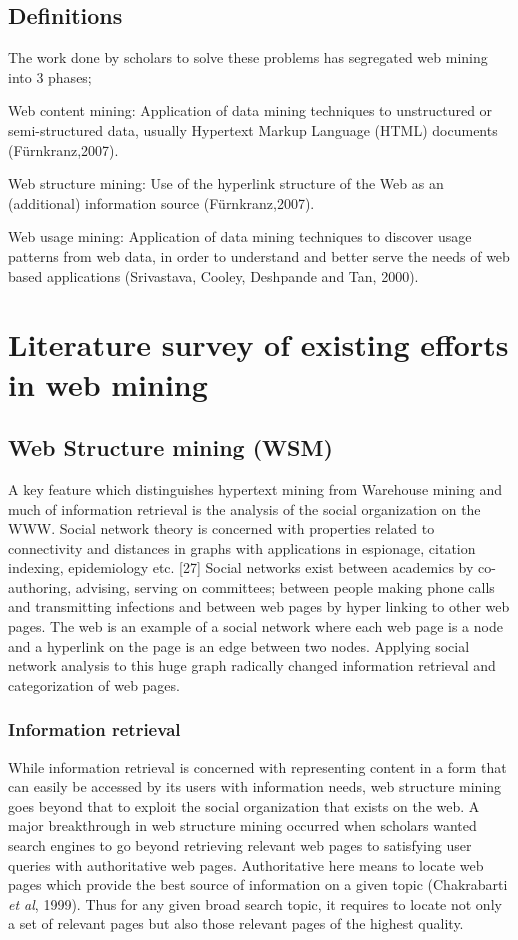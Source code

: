 \documentclass{article}
\begin{document}
\subsection{Definitions}
The work done by scholars to solve these problems has segregated web mining into 3 phases; 

 Web content mining: Application of data mining techniques to unstructured or semi-structured data, usually Hypertext Markup Language (HTML) documents (Fürnkranz,2007).

Web structure mining: Use of the hyperlink structure of the Web as an (additional) information source (Fürnkranz,2007).

Web usage mining:  Application of data mining techniques to discover usage patterns from web data, in order to understand and better serve the needs of web based applications (Srivastava, Cooley, Deshpande and Tan, 2000).
\pagebreak
\section{Literature survey of existing efforts in web mining}
\subsection{Web Structure mining (WSM)}

A key feature which distinguishes hypertext mining from Warehouse mining and much of information retrieval is the analysis of the social organization on the WWW. Social network theory is concerned with properties related to connectivity and distances in graphs with applications in espionage, citation indexing, epidemiology etc. [27] Social networks exist between academics by co-authoring, advising, serving on committees; between people making phone calls and transmitting infections and between web pages by hyper linking to other web pages. The web is an example of a social network where each web page is a node and a hyperlink on the page is an edge between two nodes. Applying social network analysis to this huge graph radically changed information retrieval and categorization of web pages.


\subsubsection{ Information retrieval}
While information retrieval is concerned with representing content in a form that can easily be accessed by its users with information needs, web structure mining goes beyond that to exploit the social organization that exists on the web. A major breakthrough in web structure mining occurred when scholars wanted search engines to go beyond retrieving relevant web pages to satisfying user queries with authoritative web pages. Authoritative here means to locate web pages which provide the best source of information on a given topic (Chakrabarti \textit{et al}, 1999). Thus for any given broad search topic, it requires to locate not only a set of relevant pages but also those relevant pages of the highest quality.
\end{document}

